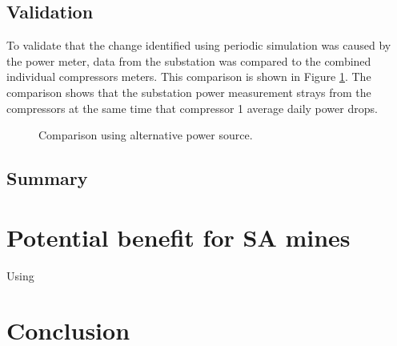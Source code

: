    \subsection{Validation}
To validate that the change identified using periodic simulation was caused by the power meter, data from the substation was compared to the combined individual compressors meters. This comparison is shown in Figure \ref{fig: Corrected Periodic simulation}. The comparison shows that the substation power measurement strays from the compressors at the same time that compressor 1 average daily power drops.
	\begin{figure}[h]
		\centering
		
		\caption{Comparison using alternative power source.}
		\label{fig: Corrected Periodic simulation}
	\end{figure}    
	
	\subsection{Summary}
\newpage
\section{Potential benefit for SA mines}

	Using  
\section{Conclusion}